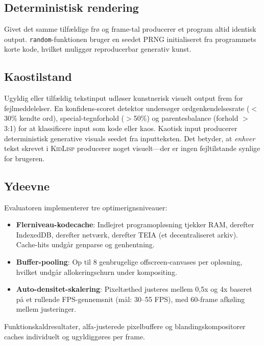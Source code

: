 \documentclass[10pt,letterpaper,twocolumn]{article}
\newcommand{\kidlisp}{\textsc{KidLisp}}
\begin{document}
\subsection{Deterministisk rendering}

Givet det samme tilfældige frø og frame-tal producerer et program altid identisk output. \texttt{random}-funktionen bruger en seedet PRNG initialiseret fra programmets korte kode, hvilket muliggør reproducerbar generativ kunst.

\subsection{Kaostilstand}

Ugyldig eller tilfældig tekstinput udløser kunstnerisk visuelt output frem for fejlmeddelelser. En konfidens-scoret detektor undersøger ordgenkendelsesrate ($<$30\% kendte ord), special-tegnforhold ($>$50\%) og parentesbalance (forhold $>$3:1) for at klassificere input som kode eller kaos. Kaotisk input producerer deterministisk generative visuals seedet fra inputteksten. Det betyder, at \emph{enhver} tekst skrevet i \kidlisp{} producerer noget visuelt---der er ingen fejltilstande synlige for brugeren.

\subsection{Ydeevne}

Evaluatoren implementerer tre optimerignsniveauer:

\begin{itemize}
  \item \textbf{Flerniveau-kodecache}: Indlejret programopløsning tjekker RAM, derefter IndexedDB, derefter netværk, derefter TEIA (et decentraliseret arkiv). Cache-hits undgår genparse og genhentning.
  \item \textbf{Buffer-pooling}: Op til 8 genbrugelige offscreen-canvases per opløsning, hvilket undgår allokeringschurn under kompositing.
  \item \textbf{Auto-densitet-skalering}: Pixeltæthed justeres mellem 0,5x og 4x baseret på et rullende FPS-gennemsnit (mål: 30--55 FPS), med 60-frame afkøling mellem justeringer.
\end{itemize}

Funktionskaldresultater, alfa-justerede pixelbuffere og blandingskompositorer caches individuelt og ugyldiggøres per frame.

\end{document}
